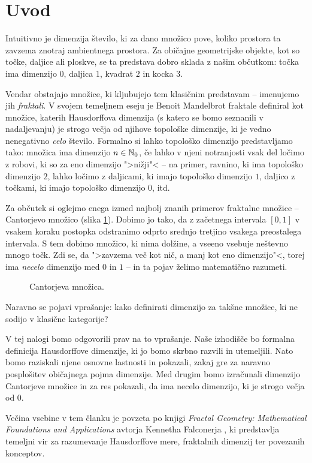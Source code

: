 \section{Uvod}
Intuitivno je dimenzija število, ki za dano množico pove, koliko prostora ta zavzema znotraj ambientnega prostora. Za običajne geometrijske objekte, kot so točke, daljice ali ploskve, se ta predstava dobro sklada z našim občutkom: točka ima dimenzijo \(0\), daljica \(1\), kvadrat \(2\) in kocka \(3\).

Vendar obstajajo množice, ki kljubujejo tem klasičnim predstavam -- imenujemo jih \emph{fraktali}. V svojem temeljnem eseju je Benoit Mandelbrot fraktale definiral kot množice, katerih Hausdorffova dimenzija (s katero se bomo seznanili v nadaljevanju) je strogo večja od njihove topološke dimenzije, ki je vedno nenegativno \emph{celo} število. Formalno si lahko topološko dimenzijo predstavljamo tako: množica ima dimenzijo \(n \in \mathbb{N}_0\), če lahko v njeni notranjosti vsak del ločimo z robovi, ki so za eno dimenzijo ">nižji"< -- na primer, ravnino, ki ima topološko dimenzijo \(2\), lahko ločimo z daljicami, ki imajo topološko dimenzijo \(1\), daljico z točkami, ki imajo topološko dimenzijo \(0\), itd.

Za občutek si oglejmo enega izmed najbolj znanih primerov fraktalne množice -- Cantorjevo množico (slika \ref{fig:cantor-set}). Dobimo jo tako, da z začetnega intervala \([0,1]\) v vsakem koraku postopka odstranimo odprto srednjo tretjino vsakega preostalega intervala. S tem dobimo množico, ki nima dolžine, a vseeno vsebuje neštevno mnogo točk. Zdi se, da ">zavzema več kot nič, a manj kot eno dimenzijo"<, torej ima \emph{necelo} dimenzijo med \(0\) in \(1\) -- in ta pojav želimo matematično razumeti.

\begin{figure}[ht]
    \centering
    \caption{Cantorjeva množica.}
    \label{fig:cantor-set}
\end{figure}

Naravno se pojavi vprašanje: kako definirati dimenzijo za takšne množice, ki ne sodijo v klasične kategorije?

V tej nalogi bomo odgovorili prav na to vprašanje. Naše izhodišče bo formalna definicija Hausdorffove dimenzije, ki jo bomo skrbno razvili in utemeljili. Nato bomo raziskali njene osnovne lastnosti in pokazali, zakaj gre za naravno posplošitev običajnega pojma dimenzije. Med drugim bomo izračunali dimenzijo Cantorjeve množice in za res pokazali, da ima necelo dimenzijo, ki je strogo večja od \(0\).

Večina vsebine v tem članku je povzeta po knjigi \emph{Fractal Geometry: Mathematical Foundations and Applications} avtorja Kennetha Falconerja \cite{fk-fg}, ki predstavlja temeljni vir za razumevanje Hausdorffove mere, fraktalnih dimenzij ter povezanih konceptov.